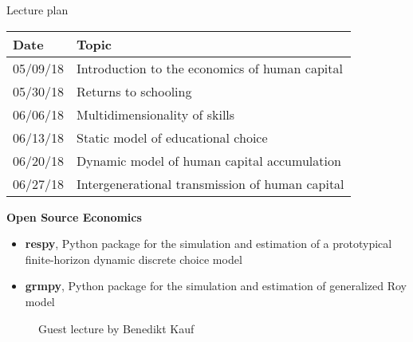 \begin{frame}
\centering
\begin{threeparttable}\footnotesize
  \caption{Lecture plan}
  \begin{tabular}{ll}\toprule
  Date & Topic \\\midrule
05/09/18 & Introduction to the economics of human capital\\
05/30/18 & Returns to schooling \\
06/06/18 & Multidimensionality of skills \\
06/13/18 & Static model of educational choice \\
06/20/18 & Dynamic model of human capital accumulation \\
06/27/18 & Intergenerational transmission of human capital\\
\bottomrule
\end{tabular}
\end{threeparttable}
\end{frame}
\begin{frame}\textbf{Open Source Economics}\vspace{0.3cm}

\begin{itemize}\setlength\itemsep{1em}
\item \textbf{respy}, Python package for the simulation and estimation of a prototypical finite-horizon dynamic discrete choice model
\item \textbf{grmpy}, Python package for the simulation and estimation of generalized Roy model
\end{itemize}
\end{frame}
\begin{frame}
	\begin{figure}
		\caption{Guest lecture by Benedikt Kauf}
		\centering{}
	\end{figure}
\end{frame}
